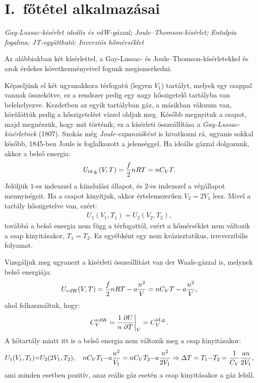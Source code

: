 \section{I.~főtétel alkalmazásai}
\emph{Gay-Lussac-kísérlet ideális és vdW-gázzal; Joule--Thomson-kísérlet; Entalpia fogalma; JT-együttható; Inverziós hőmérséklet}

Az alábbiakban két kísérlettel, a Gay-Lussac- és Joule--Thomson-kísérletekkel és azok érdekes következményeivel fogunk megismerkedni.
 
Képzeljünk el két ugyanakkora térfogatú (legyen $V_1$) tartályt, melyek egy csappal vannak összekötve, ez a rendszer pedig egy nagy hőszigetelő tartályba van belehelyezve. Kezdetben az egyik tartályban gáz, a másikban vákuum van, körülöttük pedig a hőszigetelést vízzel oldjuk meg. Később megnyituk a csapot, majd megnézzük, hogy mit történik; ez a kísérleti összeállítása a \emph{Gay-Lussac-kísérletnek} (1807). Szokás még \emph{Joule-expanzióként} is hivatkozni rá, ugyanis sokkal később, 1845-ben Joule is foglalkozott a jelenséggel. Ha ideális gázzal dolgozunk, akkor a belső energia:
\begin{align}
    U_{\textnormal{id.g.}}(V,T) = \frac f2 nRT = nC_VT.
\end{align}
Jelöljük $1$-es indexszel a kiindulási állapot, és $2$-es indexszel a végállapot mennyiségeit. Ha a csapot kinyitjuk, akkor értelemszerűen $V_2 = 2V_1$ lesz. Mivel a tartály hőszigetelve van, ezért:
\begin{align}
    U_1(V_1,T_1) = U_2(V_2,T_2),
\end{align}
továbbá a belső energia nem függ a térfogattól, ezért a hőmérséklet nem változik a csap kinyitásakor, $T_1=T_2$. Ez egyébként egy nem kvázisztatikus, irreverzibilis folyamat.

Vizsgáljuk meg ugyanezt a kísérleti összeállítást van der Waals-gázzal is, melynek belső energiája:
\begin{align}
    U_{\textnormal{vdW}}(V,T) = \frac f2 nRT - a\frac{n^2}{V} = nC_VT-a\frac{n^2}{V},
\end{align}
ahol felhasználtuk, hogy:
\begin{align}
    C_V^{\textnormal{vdW}} = \frac{1}{n}\frac{\partial{U}}{\partial{T}}\bigg|_V = C_V^{\textnormal{id.g.}}.
\end{align}
A hőtartály miatt itt is a belső energia nem változik meg a csap kinyitásakor:
\begin{align}
    U_1(V_1,T_1){=}U_2(2V_1,T_2),\quad nC_VT_1 {-} a\frac{n^2}{V_1} = nC_VT_2{-}a\frac{n^2}{2V_1}\Rightarrow \Delta T=T_1{-}T_2 = \frac{1}{C_V} \frac{an}{2V_1},
\end{align}
ami minden esetben pozitív, azaz reális gáz esetén a csap kinyitásakor a gáz lehűl.

